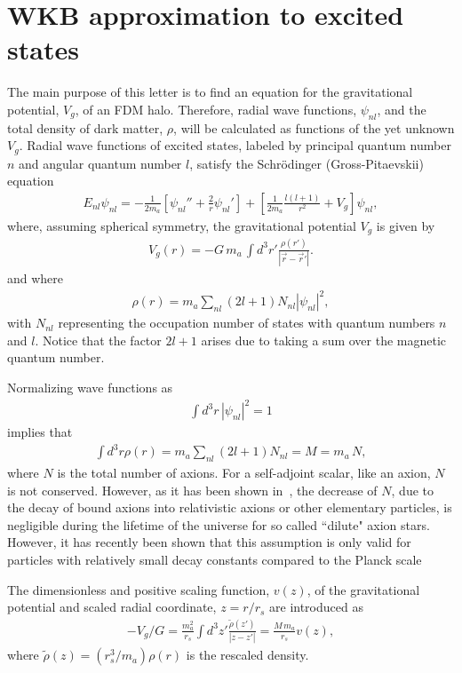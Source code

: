 \documentclass[aps,prl,twocolumn]{revtex4}
\begin{document}
\section{WKB approximation to excited states}
The main purpose of this letter is to find an equation for the gravitational potential, $V_g$, of an FDM halo.  Therefore, radial wave functions, $\psi_{nl}$, and the total density of dark matter, $\rho$, will be calculated as functions of the yet unknown $V_g$. Radial wave functions of excited states, labeled by principal quantum number $n$ and angular quantum number $l$,  satisfy the Schr\"odinger (Gross-Pitaevskii) equation
\begin{align}\label{scheq} 
E_{nl}\psi_{nl}=-\frac{1}{2m_a}\left[\psi_{nl}''+\frac{2}{r}\psi_{nl}'\right]+\left[\frac{1}{2 m_a}\frac{l(l+1)}{r^2}+V_g\right]\psi_{nl},
\end{align}
where, assuming spherical symmetry, the gravitational potential $V_g$ is given by
\begin{align*}
V_g(r)=- G \, m_a\, \int d^3r'\frac{\rho(r')}{|\vec r-\vec r'|}.
\end{align*}
and where
\begin{align*}
    \rho(r)=m_a\sum_{nl}(2l+1)N_{nl}|\psi_{nl}|^2,
\end{align*}
with $N_{nl}$ representing the occupation number of  states with quantum numbers $n$ and $l$.  Notice that the factor $2l+1$ arises due to taking a sum over the magnetic quantum number.

Normalizing wave functions as
\begin{align*}
    \int d^3r\,|\psi_{nl}|^2=1
\end{align*}
implies that
\begin{align*}
    \int d^3r\rho(r)=m_a\sum_{nl}(2l+1)N_{nl}=M= m_a\,N,
\end{align*}
where $N$ is the total number of axions. For a self-adjoint scalar, like an axion, $N$ is not conserved. However, as it has been shown in~\cite{ESW,EMSW,Braaten}, the decrease of $N$, due to the decay of bound axions into relativistic axions or other elementary particles, is negligible during the lifetime of the universe for so called ``dilute" axion stars.  However, it has recently been shown that this assumption is only valid for particles with relatively small decay constants compared to the Planck scale~\cite{ESSW}

The dimensionless and positive scaling function, $v(z)$, of the gravitational potential and scaled radial coordinate, $z=r/r_s$ are introduced as
\begin{align}\label{gravpot}
   - V_g / G =\frac{m_a^2}{r_s}\int d^3z'\frac{\tilde\rho(z')}{|z-z'|}=\frac{M\, m_a}{r_s}v(z),
\end{align}
where $\tilde\rho(z) = \left(r_s^3/m_a\right) \rho(r)$ is the rescaled density.
\end{document}
